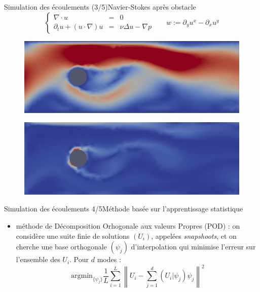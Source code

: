 \documentclass{beamer}
\begin{document}
\begin{frame}{Simulation des écoulements (3/5)}{Navier-Stokes après obstacle}
    \begin{equation*}
        \left\{
        \begin{array}{rcl}
        \nabla \cdot u & = & 0 \\
        \partial_t u + (u\cdot\nabla)u & = & \nu \Delta u - \nabla p
        \end{array}
        \right.
        \hspace{20pt} w := \partial_y u^x - \partial_x u^y
    \end{equation*}
    \begin{figure}
    \centering
        \includegraphics[height=.30\textheight]{images/navierStokes_obstacle_vitesse.jpg}
    \end{figure}
    \begin{figure}
    \centering
        \includegraphics[height=.30\textheight]{images/navierStokes_obstacle_vortex.jpg}
    \end{figure}
\end{frame}

\begin{frame}{Simulation des écoulements 4/5}{Méthode basée sur l'apprentissage statistique}
    \begin{itemize}
        \item méthode de Décomposition Orhogonale aux valeurs Propres (POD) : on considère une suite finie de solutions $(U_i)$, appelées \emph{snapshoots}, et on cherche une base orthogonale $(\psi_j)$ d'interpolation qui minimise l'erreur sur l'ensemble des $U_i$. Pour $d$ modes : $$ \text{argmin}_{\{\psi_j\}} \frac{1}{L} \sum_{i=1}^{L} \left\| U_i - \sum_{j=1}^{d} (U_i|\psi_j) \psi_j \right\|^2 $$
    \end{itemize}
\end{frame}
\end{document}
